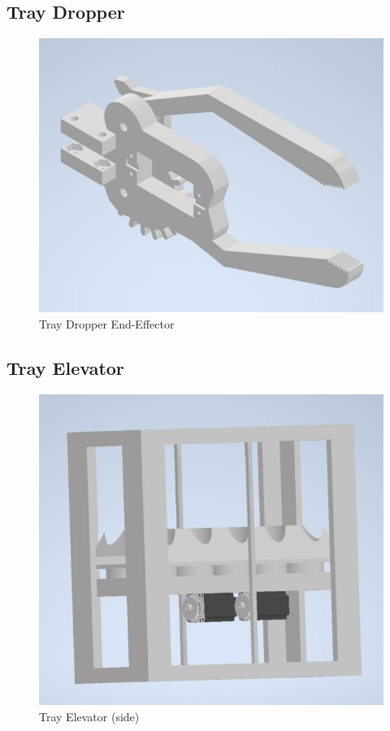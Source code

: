 \documentclass[12pt, titlepage]{article}
\begin{document}
\subsection{Tray Dropper}
\begin{figure}[H]
  \centering
  \includegraphics{Tray_Dropper.jpg}
  \caption{Tray Dropper End-Effector}
  \label{fig:dropper1}
\end{figure}

\subsection{Tray Elevator}
\begin{figure}[H]
  \centering
  \includegraphics{Tray_Elevator.jpg}
  \caption{Tray Elevator (side)}
  \label{fig:elevator1}
\end{figure}
\end{document}
